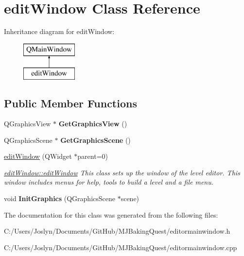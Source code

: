 \hypertarget{classedit_window}{\section{edit\-Window Class Reference}
\label{classedit_window}
}
Inheritance diagram for edit\-Window\-:\begin{figure}[H]
\begin{center}
\leavevmode
\includegraphics[height=2.000000cm]{classedit_window}
\end{center}
\end{figure}
\subsection*{Public Member Functions}
\begin{DoxyCompactItemize}
\item 
\hypertarget{classedit_window_a3584b9b685c463d050ce2925c13a44e7}{Q\-Graphics\-View $\ast$ {\bfseries Get\-Graphics\-View} ()}\label{classedit_window_a3584b9b685c463d050ce2925c13a44e7}

\item 
\hypertarget{classedit_window_aefaed4216416797acd5ade0da432f4dc}{Q\-Graphics\-Scene $\ast$ {\bfseries Get\-Graphics\-Scene} ()}\label{classedit_window_aefaed4216416797acd5ade0da432f4dc}

\item 
\hypertarget{classedit_window_a494969043b61ec9664804df9253cb8c9}{\hyperlink{classedit_window_a494969043b61ec9664804df9253cb8c9}{edit\-Window} (Q\-Widget $\ast$parent=0)}\label{classedit_window_a494969043b61ec9664804df9253cb8c9}

\begin{DoxyCompactList}\small\item\em \hyperlink{classedit_window_a494969043b61ec9664804df9253cb8c9}{edit\-Window\-::edit\-Window} This class sets up the window of the level editor. This window includes menus for help, tools to build a level and a file menu. \end{DoxyCompactList}\item 
\hypertarget{classedit_window_a39528533eb2ffcc4a8442b3c02eb1ffd}{void {\bfseries Init\-Graphics} (Q\-Graphics\-Scene $\ast$scene)}\label{classedit_window_a39528533eb2ffcc4a8442b3c02eb1ffd}

\end{DoxyCompactItemize}


The documentation for this class was generated from the following files\-:\begin{DoxyCompactItemize}
\item 
C\-:/\-Users/\-Joslyn/\-Documents/\-Git\-Hub/\-M\-J\-Baking\-Quest/editormainwindow.\-h\item 
C\-:/\-Users/\-Joslyn/\-Documents/\-Git\-Hub/\-M\-J\-Baking\-Quest/editormainwindow.\-cpp\end{DoxyCompactItemize}

